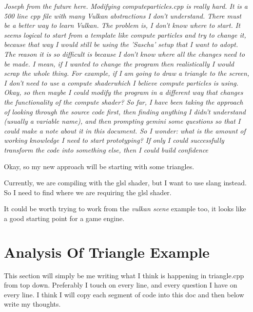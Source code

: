 \documentclass{article}
\begin{document}
\par \textit{Joseph from the future here. Modifying
computeparticles.cpp is really hard. It is a 500 line cpp file with
many Vulkan abstractions I don't understand. There must be a better
way to learn Vulkan. The problem is, I don't know where to start. It
seems logical to start from a template like compute particles and try
to change it, because that way I would still be using the 'Sascha'
setup that I want to adopt. The reason it is so difficult is because
I don't know where all the changes need to be made. I mean, if I
wanted to change the program then realistically I would scrap the
whole thing. For example, if I am going to draw a triangle to the
screen, I don't need to use a compute shader\textemdash which I
believe compute particles is using. Okay, so then maybe I could
modify the program in a different way that changes the functionality
of the compute shader? So far, I have been taking the approach of
looking through the source code first, then finding anything I didn't
understand (usually a variable name), and then prompting gemini some
questions so that I could make a note about it in this document. So I
wonder: what is the amount of working knowledge I need to start
prototyping? If only I could successfully transform the code into
something else, then I could build confidence}

\par Okay, so my new approach will be starting with some triangles.

\par Currently, we are compiling with the glsl shader, but I want to
use slang instead. So I need to find where we are requiring the glsl shader.

\par It could be worth trying to work from the \textit{vulkan scene}
example too, it looks like a good starting point for a game engine.

\section*{Analysis Of Triangle
Example}
\par This section will simply be me writing what I think is happening
in triangle.cpp from top down. Preferably I touch on every line, and
every question I have on every line. I think I will copy each segment
of code into this doc and then below write my thoughts.
\end{document}
